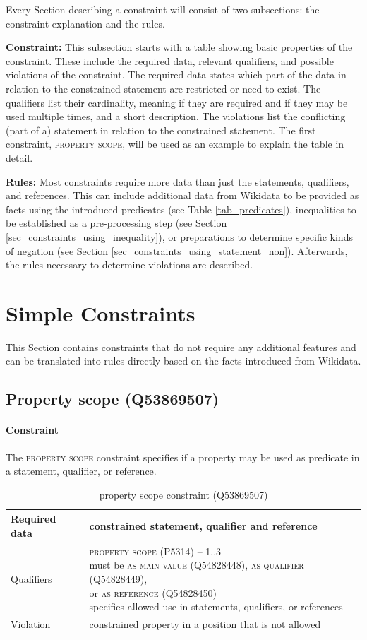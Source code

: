 \documentclass[hyperref,bachelorofscience,fleqn]{cgvpub}
\begin{document}
Every Section describing a constraint will consist of two subsections: the constraint explanation and the rules.

{\bf Constraint:} This subsection starts with a table showing basic properties of the constraint. These include the required data, relevant qualifiers, and possible violations of the constraint. The required data states which part of the data in relation to the constrained statement are restricted or need to exist. The qualifiers list their cardinality, meaning if they are required and if they may be used multiple times, and a short description. The violations list the conflicting (part of a) statement in relation to the constrained statement. The first constraint, \textsc{property scope}, will be used as an example to explain the table in detail.

{\bf Rules:} Most constraints require more data than just the statements, qualifiers, and references. This can include additional data from Wikidata to be provided as facts using the introduced predicates (see Table \ref{tab_predicates}), inequalities to be established as a pre-processing step (see Section \ref{sec_constraints_using_inequality}), or preparations to determine specific kinds of negation (see Section \ref{sec_constraints_using_statement_non}). Afterwards, the rules necessary to determine violations are described.

\section{Simple Constraints}\label{sec_simple_constraints}
This Section contains constraints that do not require any additional features and can be translated into rules directly based on the facts introduced from Wikidata.

\subsection{Property scope (Q53869507)}
\paragraph{Constraint}
The \textsc{property scope} constraint specifies if a property may be used as predicate in a statement, qualifier, or reference.
\begin{table}[H]
\caption{property scope constraint (Q53869507)}
\begin{tabularx}{\textwidth}{ ll X}
\hline
Required data & constrained statement, qualifier and reference \\
\hline
Qualifiers & \makecell{\textsc{property scope} (P5314) -- 1..3 \\ must be \textsc{as main value} (Q54828448), \textsc{as qualifier} (Q54828449), \\ or \textsc{as reference} (Q54828450) \\ specifies allowed use in statements, qualifiers, or references} \\
\hline
Violation & constrained property in a position that is not allowed \\
\hline
\end{tabularx}
\end{table}
\end{document}
